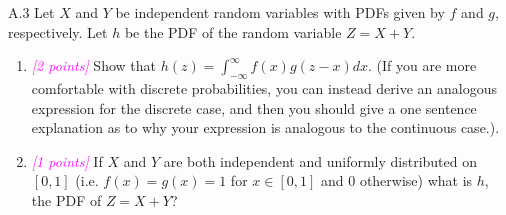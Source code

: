 \documentclass{article}
\newcommand{\1}{\mathbf{1}}
\newcommand{\points}[1]{\small\textcolor{magenta}{\emph{[#1 points]}} \normalsize}
\begin{document}
\noindent{}
A.3 Let $X$ and $Y$ be independent random variables with PDFs given by $f$ and $g$, respectively. Let $h$ be the PDF of the random variable $Z = X+Y$.
\begin{enumerate}
	\item \points{2} Show that $h(z) = \int_{-\infty}^\infty f(x) g( z - x ) d x $.  (If you are more comfortable with discrete probabilities, you can instead derive an analogous expression for the discrete case,  and then you should give a one sentence explanation as to why your expression is analogous to the continuous case.).
	\item \points{1} If $X$ and $Y$ are both independent and uniformly distributed on $[0,1]$ (i.e. $f(x)=g(x)=1$ for $x \in [0,1]$ and $0$ otherwise) what is $h$, the PDF of $Z=X+Y$?
\end{enumerate}

\noindent{}
\end{document}
